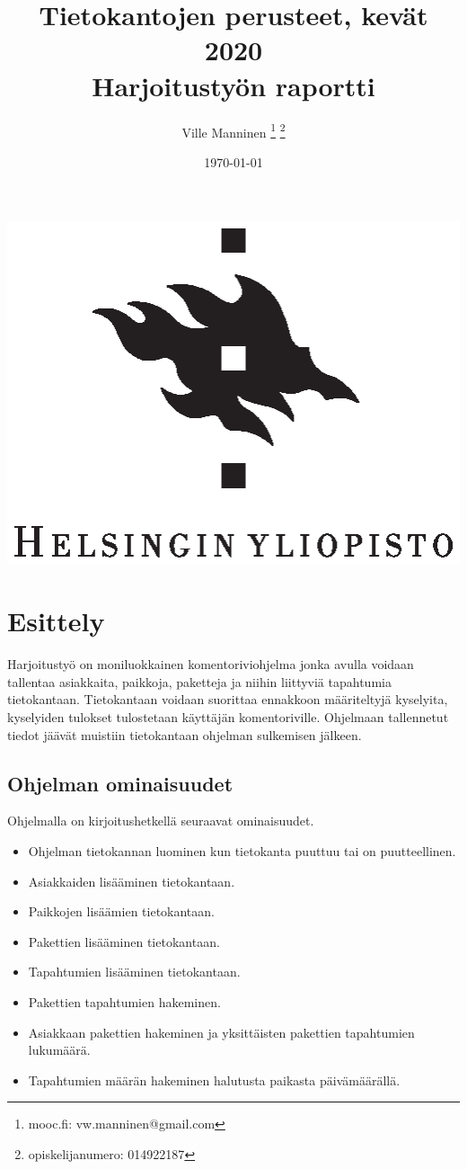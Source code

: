 \documentclass[11pt,a4paper]{article}
\begin{document}
\author{Ville Manninen
\thanks{mooc.fi: vw.manninen@gmail.com}
\thanks{opiskelijanumero: 014922187}}
\date{\today}
\title{Tietokantojen perusteet, kevät 2020 \\
Harjoitustyön raportti}
\maketitle
\begin{center}
\vspace{2cm}
\includegraphics{university-of-helsinki-2.eps} 
\end{center}
\newpage
\tableofcontents
\newpage
\section{Esittely}
Harjoitustyö on moniluokkainen komentoriviohjelma jonka avulla voidaan tallentaa asiakkaita, paikkoja, paketteja ja niihin liittyviä tapahtumia tietokantaan. Tietokantaan voidaan suorittaa ennakkoon määriteltyjä kyselyita, kyselyiden tulokset tulostetaan käyttäjän komentoriville. Ohjelmaan tallennetut tiedot jäävät muistiin tietokantaan ohjelman sulkemisen jälkeen.

\subsection*{Ohjelman ominaisuudet}
Ohjelmalla on kirjoitushetkellä seuraavat ominaisuudet.
\begin{itemize}
\item Ohjelman tietokannan luominen kun tietokanta puuttuu tai on puutteellinen.
\item Asiakkaiden lisääminen tietokantaan.
\item Paikkojen lisäämien tietokantaan.
\item Pakettien lisääminen tietokantaan.
\item Tapahtumien lisääminen tietokantaan.
\item Pakettien tapahtumien hakeminen.
\item Asiakkaan pakettien hakeminen ja yksittäisten pakettien tapahtumien lukumäärä.
\item Tapahtumien määrän hakeminen halutusta paikasta päivämäärällä.
\end{itemize}
\newpage
\end{document}
